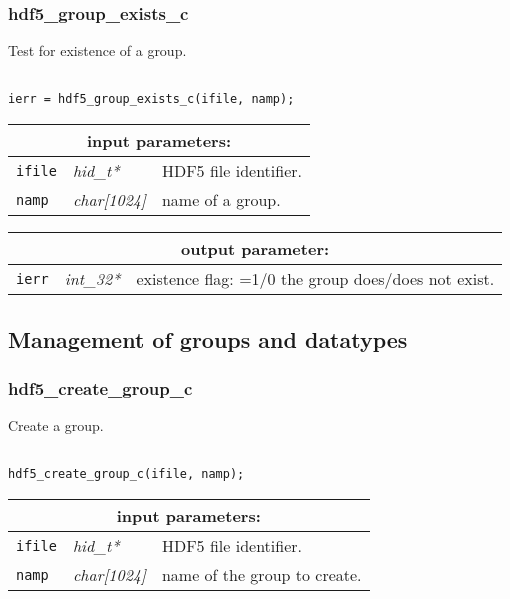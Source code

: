\subsubsection{hdf5\_group\_exists\_c}

Test for existence of a group.

\begin{verbatim}

ierr = hdf5_group_exists_c(ifile, namp);
\end{verbatim}

\noindent
\begin{tabular}{|p{1.5cm}|p{2cm}|p{11cm}|}
\hline
\multicolumn{3}{|c|}{\bf input parameters:} \\
\hline
{\tt ifile} & {\it hid\_t*} & HDF5 file identifier. \\
\hline
{\tt namp} & {\it char[1024]} & name of a group. \\
\hline
\end{tabular}

\vskip 0.8cm

\noindent
\begin{tabular}{|p{1.5cm}|p{2cm}|p{11cm}|}
\hline
\multicolumn{3}{|c|}{\bf output parameter:} \\
\hline
{\tt ierr} & {\it int\_32*} & existence flag: =1/0 the group does/does not exist. \\
\hline
\end{tabular}

\vskip 0.8cm

\subsection{Management of groups and datatypes}

\subsubsection{hdf5\_create\_group\_c}

Create a group.

\begin{verbatim}

hdf5_create_group_c(ifile, namp);
\end{verbatim}

\noindent
\begin{tabular}{|p{1.5cm}|p{2cm}|p{11cm}|}
\hline
\multicolumn{3}{|c|}{\bf input parameters:} \\
\hline
{\tt ifile} & {\it hid\_t*} & HDF5 file identifier. \\
\hline
{\tt namp} & {\it char[1024]} & name of the group to create. \\
\hline
\end{tabular}

